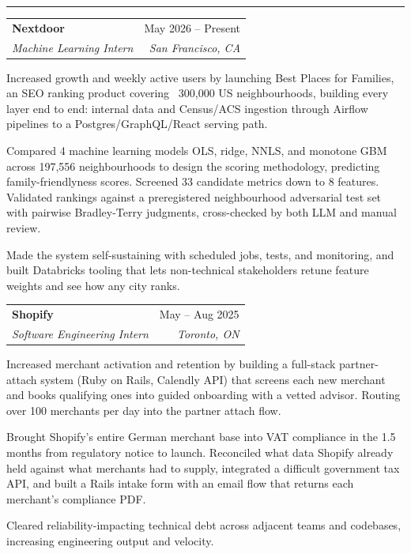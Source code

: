 \documentclass[letterpaper,10pt]{article}
\makeatletter
\newcommand{\Section}[1]{\vspace{4pt}{\large\bfseries #1}\vspace{1pt}\hrule\vspace{3pt}}
\newcommand{\entry}[4]{%
  \vspace{2pt}%
  \begin{tabular*}{\textwidth}{@{}l@{\extracolsep{\fill}}r@{}}
    \textbf{#1} & #2 \\
    \textit{#3} & \textit{#4} \\
  \end{tabular*}\vspace{-4pt}}
\newenvironment{bullets}%
  {\begin{list}{\textbullet}{%
     \setlength{\leftmargin}{1.3em}\setlength{\labelsep}{0.5em}%
     \setlength{\itemsep}{1.5pt}\setlength{\topsep}{2pt}%
     \setlength{\parsep}{0pt}\setlength{\partopsep}{0pt}}}%
  {\end{list}}
\makeatother
\begin{document}
\Section{Experience}
\entry{Nextdoor}{May 2026 -- Present}{Machine Learning Intern}{San Francisco, CA}
\begin{bullets}
  \item Increased growth and weekly active users by launching Best Places for Families, an SEO ranking product covering ~300,000 US neighbourhoods, building every layer end to end: internal data and Census/ACS ingestion through Airflow pipelines to a Postgres/GraphQL/React serving path.
  \item Compared 4 machine learning models OLS, ridge, NNLS, and monotone GBM across 197,556 neighbourhoods to design the scoring methodology, predicting family-friendlyness scores. Screened 33 candidate metrics down to 8 features. Validated rankings against a preregistered neighbourhood adversarial test set with pairwise Bradley-Terry judgments, cross-checked by both LLM and manual review.
  \item Made the system self-sustaining with scheduled jobs, tests, and monitoring, and built Databricks tooling that lets non-technical stakeholders retune feature weights and see how any city ranks.

\end{bullets}
\entry{Shopify}{May -- Aug 2025}{Software Engineering Intern}{Toronto, ON}
\begin{bullets}
  \item Increased merchant activation and retention by building a full-stack partner-attach system (Ruby on Rails, Calendly API) that screens each new merchant and books qualifying ones into guided onboarding with a vetted advisor. Routing over 100 merchants per day into the partner attach flow.
  \item Brought Shopify's entire German merchant base into VAT compliance in the 1.5 months from regulatory notice to launch. Reconciled what data Shopify already held against what merchants had to supply, integrated a difficult government tax API, and built a Rails intake form with an email flow that returns each merchant's compliance PDF.
  \item Cleared reliability-impacting technical debt across adjacent teams and codebases, increasing engineering output and velocity.
\end{bullets}
\end{document}
